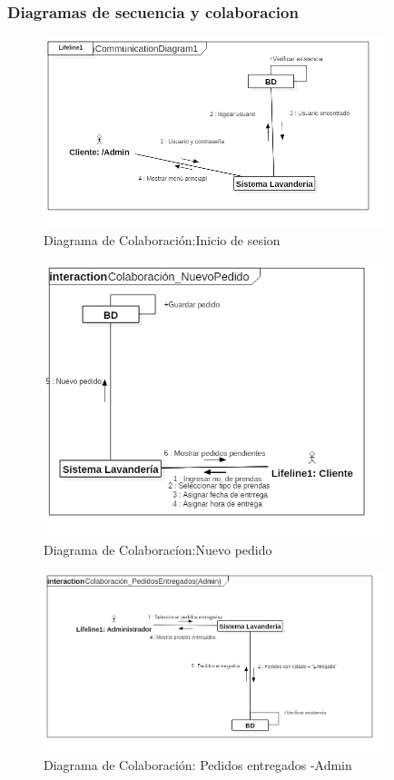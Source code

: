 \newpage


\subsubsection{Diagramas de secuencia y colaboracion}

\begin{figure}[htb]
\begin{center}
\includegraphics[width=10cm]{./imagenes/diagramas/Colaboracion_IniciarSesion.png}
\end{center}
\caption{Diagrama de Colaboración:Inicio de sesion}
\end{figure}


\begin{figure}[htb]
\begin{center}
\includegraphics[width=10cm]{./imagenes/diagramas/Colaboracion_NuevoPedido.png}
\end{center}
\caption{Diagrama de Colaboracíon:Nuevo pedido}
\end{figure}


\begin{figure}[htb]
\begin{center}
\includegraphics[width=10cm]{./imagenes/diagramas/Colaboracion_PedidosEntregados(Admin).png}
\end{center}
\caption{Diagrama de Colaboración: Pedidos entregados -Admin}
\end{figure}


